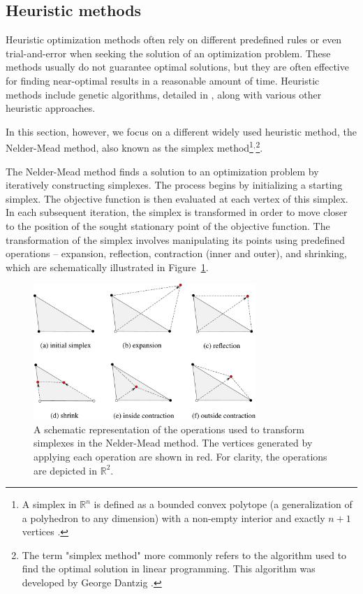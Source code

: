 \subsection{Heuristic methods}\label{heuristic}
Heuristic optimization methods often rely on different predefined rules or even trial-and-error when seeking the solution of an optimization problem. These methods usually do not guarantee optimal solutions, but they are often effective for finding near-optimal results in a reasonable amount of time. Heuristic methods include genetic algorithms, detailed in \cite{BBO-textbook}, along with various other heuristic approaches.

In this section, however, we focus on a different widely used heuristic method, the Nelder-Mead method, also known as the simplex method\footnote{A simplex in $ \mathbb{R}^n $ is defined as a bounded convex polytope (a generalization of a polyhedron to any dimension) with a non-empty interior and exactly $ n+1 $ vertices \cite{BBO-textbook}.}$^{,}$\footnote{The term "simplex method" more commonly refers to the algorithm used to find the optimal solution in linear programming. This algorithm was developed by George Dantzig \cite{Dantzig1990}.}\cite{Nelder1965}.

The Nelder-Mead method finds a solution to an optimization problem by iteratively constructing simplexes. The process begins by initializing a starting simplex. The objective function is then evaluated at each vertex of this simplex. In each subsequent iteration, the simplex is transformed in order to move closer to the position of the sought stationary point of the objective function. The transformation of the simplex involves manipulating its points using predefined operations -- expansion, reflection, contraction (inner and outer), and shrinking, which are schematically illustrated in Figure~\ref{fig:NM operations}. 

\begin{figure}[h]
	\centering
	\includegraphics[width=0.75\textwidth]{figures/neldermead.pdf}
	\vspace{2mm}
	\caption{A schematic representation of the operations used to transform simplexes in the Nelder-Mead method. The vertices generated by applying each operation are shown in red. For clarity, the operations are depicted in $ \mathbb{R}^2 $.}
	\label{fig:NM operations}
\end{figure}

